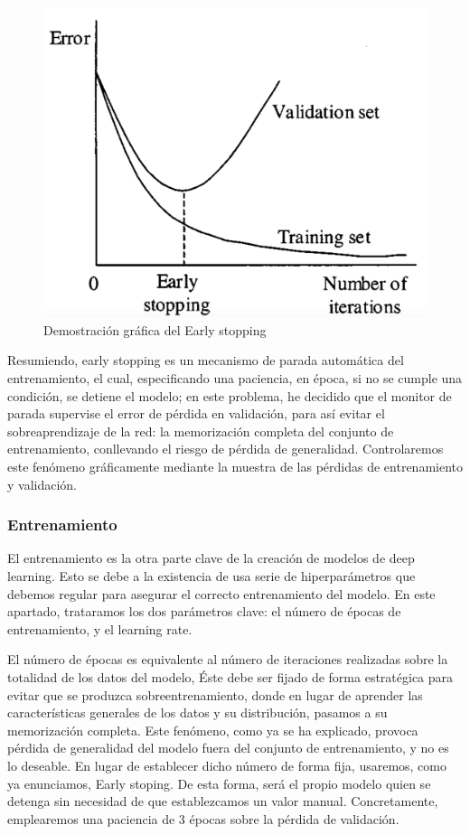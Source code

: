 \begin{figure}[H]
	\centering
	\label {earlystopping}
	\includegraphics[scale = 0.17]{imagenes/earlystopping.png}
	\caption{Demostración gráfica del Early stopping \cite{earlystop}}
\end{figure}

Resumiendo, early stopping es un mecanismo de parada automática del entrenamiento, el cual, especificando una paciencia, en época, si no se cumple una condición, se detiene el modelo; en este problema, he decidido que el monitor de parada supervise el error de pérdida en validación, para así evitar el sobreaprendizaje de la red: la memorización completa del conjunto de entrenamiento, conllevando el riesgo de pérdida de generalidad. Controlaremos este fenómeno gráficamente mediante la muestra de las pérdidas de entrenamiento y validación.

\subsubsection{Entrenamiento}

El entrenamiento es la otra parte clave de la creación de modelos de deep learning. Esto se debe a la existencia de usa serie de hiperparámetros que debemos regular para asegurar el correcto entrenamiento del modelo. En este apartado, trataramos los dos parámetros clave: el número de épocas de entrenamiento, y el learning rate.

El número de épocas es equivalente al número de iteraciones realizadas sobre la totalidad de los datos del modelo, Éste debe ser fijado de forma estratégica para evitar que se produzca sobreentrenamiento, donde en lugar de aprender las características generales de los datos y su distribución, pasamos a su memorización completa. Este fenómeno, como ya se ha explicado, provoca pérdida de generalidad del modelo fuera del conjunto de entrenamiento, y no es lo deseable. En lugar de establecer dicho número de forma fija, usaremos, como ya enunciamos, Early stoping. De esta forma, será el propio modelo quien se detenga sin necesidad de que establezcamos un valor manual. Concretamente, emplearemos una paciencia de 3 épocas sobre la pérdida de validación.\\

